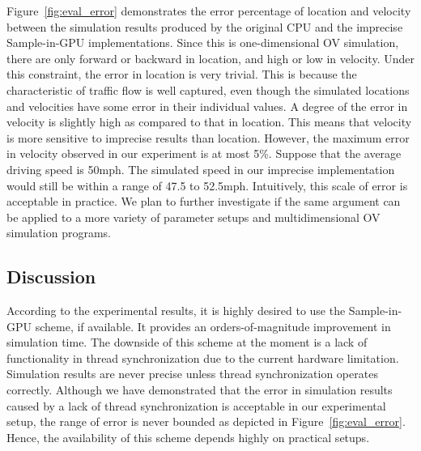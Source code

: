 \documentclass[times, 10pt, twocolumn]{article}
\begin{document}
Figure~\ref{fig:eval_error} demonstrates the error percentage of
location and velocity between the simulation results produced by the
original CPU and the imprecise Sample-in-GPU implementations.
Since this is one-dimensional OV simulation, there are only forward or
backward in location, and high or low in velocity.
Under this constraint, the error in location is very trivial.
This is because the characteristic of traffic flow is well captured,
even though the simulated locations and velocities have some error in
their individual values.
A degree of the error in velocity is slightly high as compared to that
in location.
This means that velocity is more sensitive to imprecise results than
location.
However, the maximum error in velocity observed in our experiment is at
most 5\%.
Suppose that the average driving speed is 50mph.
The simulated speed in our imprecise implementation would still be
within a range of 47.5 to 52.5mph.
Intuitively, this scale of error is acceptable in practice.
We plan to further investigate if the same argument can be applied to a
more variety of parameter setups and multidimensional OV simulation
programs.

\subsection{Discussion}
\label{sec:discussion}

According to the experimental results, it is highly desired to use the
Sample-in-GPU scheme, if available.
It provides an orders-of-magnitude improvement in simulation time.
The downside of this scheme at the moment is a lack of functionality in
thread synchronization due to the current hardware limitation.
Simulation results are never precise unless thread synchronization
operates correctly.
Although we have demonstrated that the error in simulation results
caused by a lack of thread synchronization is acceptable in our
experimental setup, the range of error is never bounded as depicted in
Figure~\ref{fig:eval_error}.
Hence, the availability of this scheme depends highly on practical
setups.
\end{document}
